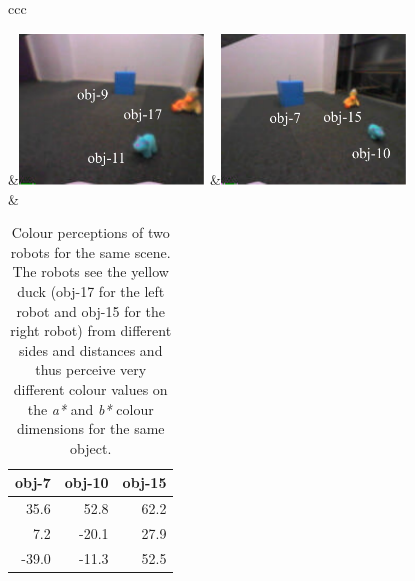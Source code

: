 \begin{table}[htbp]
  \centering\small
\begin{tabular}{ccc}
 \lsptoprule 

    &\includegraphics[width=0.37\textwidth]{chap11/figs/grounding-scene-a.pdf}
	&\includegraphics[width=0.37\textwidth]{chap11/figs/grounding-scene-b.pdf}\\
&
  \begin{tabular}{rrr}
 obj-7 & obj-10 & obj-15 \\
\midrule
      35.6 & 52.8 & 62.2 \\
      7.2 & -20.1 & 27.9 \\
      -39.0 & -11.3 & 52.5 \\ 
  \end{tabular} \\
\lspbottomrule
\end{tabular}
  \caption[Comparison between the colour perceptions of two robots for
  an example scene]{Colour perceptions of two
    robots for the same scene. The robots see the yellow duck
    (obj-17 for the left robot and obj-15 for the right robot) from
    different sides and distances and thus perceive very different colour values on 
    the \emph{a*} and \emph{b*} colour dimensions for the same object.}
  \label{f:scene-example}
\end{table}

